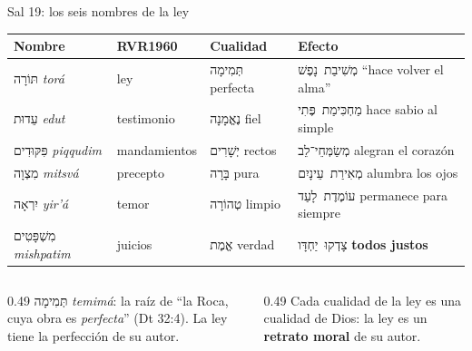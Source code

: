 \documentclass[hyperref={bookmarks=false},aspectratio=169]{beamer}
\newcommand{\heb}[1]{\mbox{\foreignlanguage{hebrew}{#1}}}
\newcommand{\destacar}[1]{\textbf{\textcolor{azul}{#1}}}
\begin{document}
\begin{frame}{Sal 19: los seis nombres de la ley}
\scriptsize\renewcommand{\arraystretch}{1.18}
\begin{tabular}{@{}>{\RaggedRight\arraybackslash}p{2.6cm}>{\RaggedRight\arraybackslash}p{1.8cm}>{\RaggedRight\arraybackslash}p{2.9cm}>{\RaggedRight\arraybackslash}p{4.6cm}@{}}
\toprule
\textbf{Nombre} & \textbf{RVR1960} & \textbf{Cualidad} & \textbf{Efecto} \\ \midrule
\heb{תּוֹרָה} \emph{torá} & ley & \heb{תְּמִימָה} perfecta & \heb{מְשִׁיבַת נָפֶשׁ} ``hace volver el alma'' \\
\heb{עֵדוּת} \emph{edut} & testimonio & \heb{נֶאֱמָנָה} fiel & \heb{מַחְכִּימַת פֶּתִי} hace sabio al simple \\
\heb{פִּקּוּדִים} \emph{piqqudim} & mandamientos & \heb{יְשָׁרִים} rectos & \heb{מְשַׂמְּחֵי־לֵב} alegran el corazón \\
\heb{מִצְוָה} \emph{mitsvá} & precepto & \heb{בָּרָה} pura & \heb{מְאִירַת עֵינָיִם} alumbra los ojos \\
\heb{יִרְאָה} \emph{yir'á} & temor & \heb{טְהוֹרָה} limpio & \heb{עוֹמֶדֶת לָעַד} permanece para siempre \\
\heb{מִשְׁפָּטִים} \emph{mishpatim} & juicios & \heb{אֱמֶת} verdad & \heb{צָדְקוּ יַחְדָּו} \destacar{todos justos} \\
\bottomrule
\end{tabular}\par\medskip
\begin{columns}[t,onlytextwidth]
\begin{column}{0.49\textwidth}\small
\heb{תְּמִימָה} \emph{temimá}: la raíz de ``la Roca, cuya obra es \emph{perfecta}'' (Dt 32:4). La ley tiene la perfección de su autor.
\end{column}
\begin{column}{0.49\textwidth}\small
Cada cualidad de la ley es una cualidad de Dios: la ley es un \destacar{retrato moral} de su autor.
\end{column}
\end{columns}
\end{frame}
\end{document}
